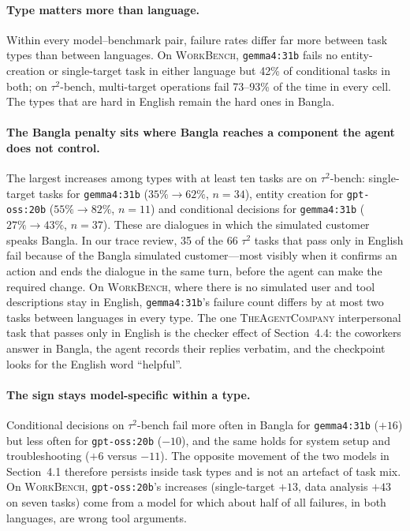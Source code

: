 \documentclass[11pt]{article}
\begin{document}
\paragraph{Type matters more than language.} Within every model--benchmark pair, failure rates
differ far more between task types than between languages. On \textsc{WorkBench},
\texttt{gemma4:31b} fails no entity-creation or single-target task in either language but 42\%
of conditional tasks in both; on $\tau^2$-bench, multi-target operations fail 73--93\% of the
time in every cell. The types that are hard in English remain the hard ones in Bangla.

\paragraph{The Bangla penalty sits where Bangla reaches a component the agent does not
control.} The largest increases among types with at least ten tasks are on $\tau^2$-bench:
single-target tasks for \texttt{gemma4:31b} ($35\%\to62\%$, $n{=}34$), entity creation for
\texttt{gpt-oss:20b} ($55\%\to82\%$, $n{=}11$) and conditional decisions for
\texttt{gemma4:31b} ($27\%\to43\%$, $n{=}37$). These are dialogues in which the simulated
customer speaks Bangla. In our trace review, 35 of the 66 $\tau^2$ tasks that pass only in
English fail because of the Bangla simulated customer---most visibly when it confirms an action
and ends the dialogue in the same turn, before the agent can make the required change. On
\textsc{WorkBench}, where there is no simulated user and tool descriptions stay in English,
\texttt{gemma4:31b}'s failure count differs by at most two tasks between languages in every
type. The one \textsc{TheAgentCompany} interpersonal task that passes only in English is the
checker effect of Section~4.4: the coworkers answer in Bangla, the agent records their replies
verbatim, and the checkpoint looks for the English word ``helpful''.

\paragraph{The sign stays model-specific within a type.} Conditional decisions on
$\tau^2$-bench fail more often in Bangla for \texttt{gemma4:31b} ($+16$) but less often for
\texttt{gpt-oss:20b} ($-10$), and the same holds for system setup and troubleshooting ($+6$
versus $-11$). The opposite movement of the two models in Section~4.1 therefore persists inside
task types and is not an artefact of task mix. On \textsc{WorkBench}, \texttt{gpt-oss:20b}'s
increases (single-target $+13$, data analysis $+43$ on seven tasks) come from a model for which
about half of all failures, in both languages, are wrong tool arguments.
\end{document}
